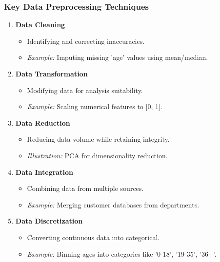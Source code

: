 \documentclass{beamer}
\begin{document}
\begin{frame}[fragile]
    \frametitle{Key Data Preprocessing Techniques}
    \begin{enumerate}
        \item \textbf{Data Cleaning}
            \begin{itemize}
                \item Identifying and correcting inaccuracies.
                \item \textit{Example:} Imputing missing 'age' values using mean/median.
            \end{itemize}
        
        \item \textbf{Data Transformation}
            \begin{itemize}
                \item Modifying data for analysis suitability.
                \item \textit{Example:} Scaling numerical features to [0, 1].
            \end{itemize}
        
        \item \textbf{Data Reduction}
            \begin{itemize}
                \item Reducing data volume while retaining integrity.
                \item \textit{Illustration:} PCA for dimensionality reduction.
            \end{itemize}
        
        \item \textbf{Data Integration}
            \begin{itemize}
                \item Combining data from multiple sources.
                \item \textit{Example:} Merging customer databases from departments.
            \end{itemize}
        
        \item \textbf{Data Discretization}
            \begin{itemize}
                \item Converting continuous data into categorical.
                \item \textit{Example:} Binning ages into categories like '0-18', '19-35', '36+'.
            \end{itemize}
    \end{enumerate}
\end{frame}
\end{document}
